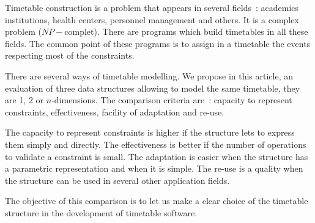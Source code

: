 Timetable construction is a problem that appears in several
fields~: academics institutions, health centers, personnel
management and others. It is a complex problem ($NP-$complet).
There are programs which  build timetables in all these fields.
The common point of these programs is to assign in a timetable the
events respecting most of the constraints.

There are several ways of timetable modelling. We propose in this
article, an evaluation of three data structures allowing to model
the same timetable, they are 1, 2 or $n$-dimensions. The
comparison criteria are~: capacity to represent constraints,
effectiveness, facility of adaptation and re-use.

The capacity to represent constraints is higher if the structure
lets to express them simply and directly. The effectiveness is
better if the number of operations to validate a constraint is
small. The adaptation is easier when the structure has a
parametric representation and when it is simple. The re-use is a
quality when the structure can be used in several other
application fields.

The objective of this comparison is to let us make a clear choice
of the timetable structure in the development of timetable
software.
